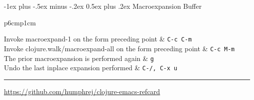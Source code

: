 \documentclass[12pt,landscape]{article}
\makeatletter
\renewcommand{\section}{\@startsection{section}{1}{0mm}%
                                {-1ex plus -.5ex minus -.2ex}%
                                {0.5ex plus .2ex}%
                                {\normalfont\large\bfseries}}
\makeatother
\begin{document}
\begin{multicols}{3}
\section{Macroexpansion Buffer}
\begin{tabular}{p{6cm}p{1cm}} %
	
	Invoke macroexpand-1 on the form preceding point & \verb!C-c C-m! \\
	Invoke clojure.walk/macroexpand-all on the form preceding point & \verb!C-c M-m! \\
	The prior macroexpansion is performed again & \verb!g! \\
	Undo the last inplace expansion performed & \verb!C-/, C-x u! \\
	
\end{tabular}

\rule{0.3\linewidth}{0.25pt}
\scriptsize

\href{https://github.com/humphrej/clojure-emacs-refcard}{https://github.com/humphrej/clojure-emacs-refcard}


\end{multicols}
\end{document}
